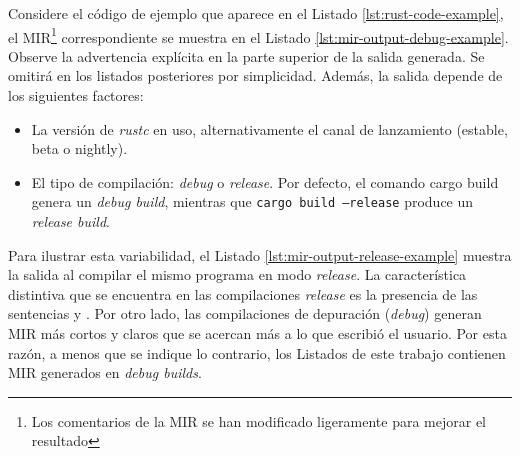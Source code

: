 Considere el código de ejemplo que aparece en el Listado \ref{lst:rust-code-example},
el \acrshort{MIR}\footnote{Los comentarios de la MIR se han modificado ligeramente para mejorar el resultado}
correspondiente se muestra en el Listado \ref{lst:mir-output-debug-example}.
Observe la advertencia explícita en la parte superior de la salida generada. Se omitirá en los
listados posteriores por simplicidad.
Además, la salida depende de los siguientes factores:

\begin{itemize}
    \item La versión de \emph{rustc} en uso, alternativamente el canal de lanzamiento (estable, beta o nightly).
    \item El tipo de compilación: \emph{debug} o \emph{release}. Por defecto, el comando cargo build genera un
          \emph{debug build}, mientras que \texttt{cargo build --release} produce un \emph{release build}.
\end{itemize}

Para ilustrar esta variabilidad, el Listado \ref{lst:mir-output-release-example}
muestra la salida al compilar el mismo programa en modo \emph{release}.
La característica distintiva que se encuentra en las compilaciones \emph{release} es la
presencia de las sentencias  y .
Por otro lado, las compilaciones de depuración (\emph{debug}) generan \acrshort{MIR} más cortos y claros
que se acercan más a lo que escribió el usuario.
Por esta razón, a menos que se indique lo contrario, los Listados de este trabajo contienen \acrshort{MIR}
generados en \emph{debug builds}.

